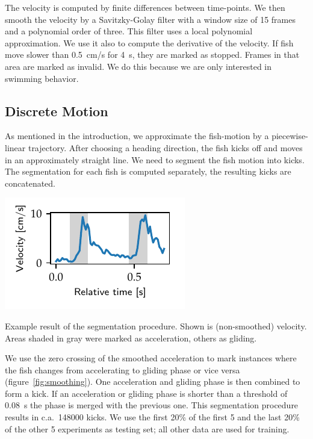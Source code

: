 \documentclass[nobib, a4paper]{tufte-handout}
\begin{document}
The velocity is computed by finite differences between time-points.
We then smooth the velocity by a Savitzky-Golay filter with a window size of 15 frames and a polynomial order of three.
This filter uses a local polynomial approximation.
We use it also to compute the derivative of the velocity.
If fish move slower than \SI{0.5}{\cm/\s} for \SI{4}{\s}, they are marked as stopped.
Frames in that area are marked as invalid.
We do this because we are only interested in swimming behavior.

\subsection{Discrete Motion}
As mentioned in the introduction, we approximate the fish-motion by a piecewise-linear trajectory.
After choosing a heading direction, the fish kicks off and moves in an approximately straight line.
We need to segment the fish motion into kicks.
The segmentation for each fish is computed separately, the resulting kicks are concatenated.

\begin{marginfigure}
\includegraphics[scale=1]{smoothing}
\caption{Example result of the segmentation procedure.
  Shown is (non-smoothed) velocity.
  Areas shaded in gray were marked as acceleration, others as gliding.
\label{fig:smoothing}}
\end{marginfigure}

We use the zero crossing of the smoothed acceleration to mark instances where the fish changes from accelerating to gliding phase or vice versa (figure~\ref{fig:smoothing}).
One acceleration and gliding phase is then combined to form a kick.
If an acceleration or gliding phase is shorter than a threshold of \SI{0.08}{\s} the phase is merged with the previous one.
This segmentation procedure results in c.a.\ 148000 kicks.
We use the first 20\% of the first 5 and the last 20\% of the other 5 experiments as testing set; all other data are used for training.
\end{document}
